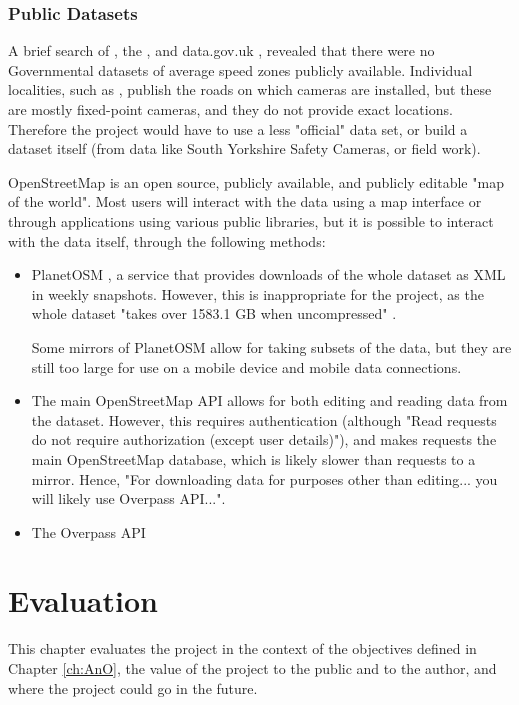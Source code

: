 \documentclass[11pt, a4paper, notitlepage]{report}
\begin{document}
\subsection{Public Datasets}
A brief search of \citet{OrdananceSurvey}, the \citet{ONSHome}, and data.gov.uk \citep{dataGovUK}, revealed that there were no Governmental datasets of average speed zones publicly available. Individual localities, such as \citet{sySpeedCamera}, publish the roads on which cameras are installed, but these are mostly fixed-point cameras, and they do not provide exact locations. Therefore the project would have to use a less "official" data set, or build a dataset itself (from data like South Yorkshire Safety Cameras, or field work).

OpenStreetMap \citep{OpenStreetMap} is an open source, publicly available, and publicly editable "map of the world". Most users will interact with the data using a map interface or through applications using various public libraries, but it is possible to interact with the data itself, through the following methods:
\begin{itemize}
	\item PlanetOSM \citep{planetOSM}, a service that provides downloads of the whole dataset as XML in weekly snapshots. However, this is inappropriate for the project, as the whole dataset "takes over 1583.1 GB when uncompressed" \citep{planetOSMwiki}.
	
	Some mirrors of PlanetOSM allow for taking subsets of the data, but they are still too large for use on a mobile device and mobile data connections.
	
	\item The main OpenStreetMap API \citep{OSMAPIv6} allows for both editing and reading data from the dataset. However, this requires authentication (although "Read requests do not require authorization (except user details)"), and makes requests the main OpenStreetMap database, which is likely slower than requests to a mirror. Hence, "For downloading data for purposes other than editing... you will likely use Overpass API...".
	
	\item The Overpass API \citep{overpassWiki}
\end{itemize}

\chapter{Evaluation}
This chapter evaluates the project in the context of the objectives defined in Chapter \ref{ch:AnO}, the value of the project to the public and to the author, and where the project could go in the future.
\end{document}
